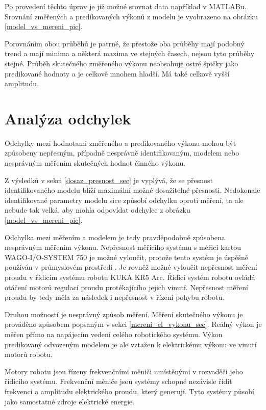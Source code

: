 Po provedení těchto úprav je již možné srovnat data například v MATLABu. Srovnání změřených a predikovaných výkonů z modelu je vyobrazeno na obrázku \ref{model_vs_mereni_pic}.

Porovnáním obou průběhů je patrné, že přestože oba průběhy mají podobný trend a mají minima a některá maxima ve stejných časech, nejsou tyto průběhy stejné. Průběh skutečného změřeného výkonu neobsahuje ostré špičky jako predikované hodnoty a je celkově mnohem hladší. Má také celkově vyšší amplitudu.  

\section{Analýza odchylek}
\label{analyza_odchylek_sec}

Odchylky mezi hodnotami změřeného a predikovaného výkonu mohou být způsobeny nepřesným, případně nesprávně identifikovaným, modelem nebo nesprávným měřením skutečných hodnot činného výkonu.

Z výsledků v sekci \ref{dosaz_presnost_sec} je vyplývá, že se přesnost identifikovaného modelu blíží maximální možné dosažitelné přesnosti. Nedokonale identifikované parametry modelu sice způsobí odchylku oproti měření, ta ale nebude tak velká, aby mohla odpovídat odchylce z obrázku \ref{model_vs_mereni_pic}.

Odchylka mezi měřením a modelem je tedy pravděpodobně způsobena nesprávným měřením výkonu. Nepřesnost měřicího systému s měřicí kartou WAGO-I/O-SYSTEM 750 je možné vyloučit, protože tento systém je úspěšně používán v průmyslovém prostředí \cite{vojtech_pavlik}. Je rovněž možné vyloučit nepřesnost měření proudu v řídicím systému robotu KUKA KR5 Arc. Řídicí systém robotu ovládá otáčení motorů regulací proudu protékajícího jejich vinutí. Nepřesnost měření proudu by tedy měla za následek i nepřesnost v řízení pohybu robotu. 

Druhou možností je nesprávný způsob měření. Měření skutečného výkonu je prováděno způsobem popsaným v sekci \ref{mereni_el_vykonu_sec}. Reálný výkon je měřen přímo na napájecím vedení celého robotického systému. Výkon predikovaný odvozeným modelem je ale vztažen k elektrickému výkonu ve vinutí motorů robotu. 

Motory robotu jsou řízeny frekvenčními měniči umístěnými v rozvaděči jeho řídicího systému. Frekvenční měniče jsou systémy schopné nezávisle řídit frekvenci a amplitudu elektrického proudu, který generují. Tyto systémy působí jako samostatné zdroje elektrické energie. 

